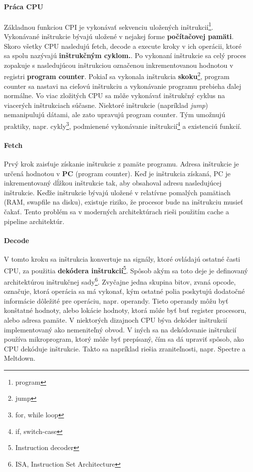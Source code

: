 \documentclass[11pt,a4paper]{report}
\begin{document}
\paragraph{Práca CPU} Základnou funkciou CPI je vykonávať sekvenciu uložených inštrukcií\footnote{program}. Vykonávané inštrukcie bývajú uložené v nejakej forme \textbf{počítačovej pamäti}. Skoro všetky CPU nasledujú fetch, decode a execute kroky v ich operácii, ktoré sa spolu nazývajú \textbf{inštrukčným cyklom.}. Po vykonaní inštrukcie sa celý proces zopakuje s nasledujúcou inštrukciou označenou inkrementovanou hodnotou v registri \textbf{program counter}. 
Pokiaľ sa vykonala inštrukcia \textbf{skoku}\footnote{jump}, program counter sa nastavi na cieľovú inštrukciu a vykonávanie programu prebieha ďalej normálne. Vo viac zložitých CPU sa môže vykonávať inštrukčný cyklus na viacerých inštrukciach súčasne. Niektoré inštrukcie (napríklad \textit{jump}) nemanipulujú dátami, ale zato upravujú program counter. Tým umožnujú praktiky, napr. cykly\footnote{for, while loop}, podmienené vykonávanie inštrukcií\footnote{if, switch-case} a existenciú funkcií.

\paragraph{Fetch} Prvý krok zaisťuje získanie inštrukcie z pamäte programu. Adresa inštrukcie je určená hodnotou v \textbf{PC} (program counter). Keď je inštrukcia získaná, PC je inkrementovaný dĺžkou inštrukcie tak, aby obsahoval adresu nasledujúcej inštrukcie. Keďže inštrukcie bývajú uložené v relatívne pomalých pamätiach (RAM, swapfile na disku), existuje riziko, že procesor bude na inštrukciu musieť čakať. Tento problém sa v moderných architektúrach rieši použitím cache a pipeline architektúr.

\paragraph{Decode} V tomto kroku sa inštrukcia konvertuje na signály, ktoré ovládajú ostatné časti CPU, za použitia \textbf{dekódera inštrukcií}\footnote{Instruction decoder}. Spôsob akým sa toto deje je definovaný architektúrou inštrukčnej sady\footnote{ISA, Instruction Set Architecture}. Zvyčajne jedna skupina bitov, zvaná opcode, označuje, ktorá operácia sa má vykonať, kým ostatné polia poskytujú dodatočné informácie dôležité pre operáciu, napr. operandy. Tieto operandy môžu byť konštatné hodnoty, alebo lokácie hodnoty, ktorá môźe byť buť register procesoru, alebo adresa pamäte. V niektorých dizajnoch CPU býva dekóder inštrukcií implementovaný ako nemeniteľný obvod. V iných sa na dekódovanie inštrukcií používa mikroprogram, ktorý môže byť prepísaný, čím sa dá upraviť spôsob, ako CPU dekóduje inštrukcie. Takto sa napríklad riešia zraniteľnosti, napr. Spectre a Meltdown.
\end{document}
